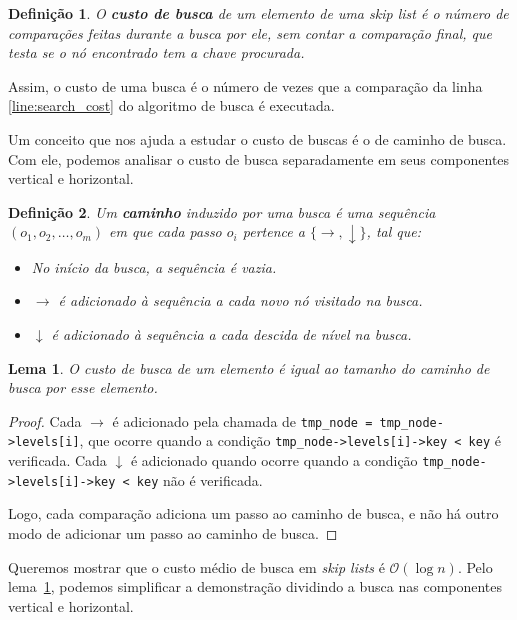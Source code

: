 \documentclass[paper=a4, fontsize=11pt]{scrartcl} %
\newtheorem{definition}{Definição}
\newtheorem{lemma}[theorem]{Lema}
\numberwithin{equation}{section}
\numberwithin{figure}{section}
\numberwithin{table}{section}
\numberwithin{definition}{section}
\numberwithin{theorem}{section}
\numberwithin{property}{section}
\numberwithin{proposition}{section}
\newcommand{\cO}{\ensuremath{\mathcal{O}}}
\newcommand{\sls}{\textit{skip lists}\xspace}
\renewcommand{\sl}{\textit{skip list}\xspace}
\begin{document}
\begin{definition}

O \textbf{custo de busca} de um elemento de uma \sl é o número de comparações feitas durante a busca por ele, sem
contar a comparação final, que testa se o nó encontrado tem a chave procurada.

\end{definition}

Assim, o custo de uma busca é o número de vezes que a comparação da linha \ref{line:search_cost} do algoritmo
de busca é executada.

Um conceito que nos ajuda a estudar o custo de buscas é o de caminho de busca. Com ele, podemos analisar o
custo de busca separadamente em seus componentes vertical e horizontal.

\begin{definition}

Um \textbf{caminho} induzido por uma busca é uma sequência $(o_1, o_2, \ldots, o_m)$ 
em que cada passo $o_i$ pertence a $\{\rightarrow, \downarrow\}$, tal que:

\begin{itemize}[noitemsep]
  \item No início da busca, a sequência é vazia.
  \item $\rightarrow$ é adicionado à sequência a cada novo nó visitado na busca.
  \item $\downarrow$ é adicionado à sequência a cada descida de nível na busca.
\end{itemize}

\end{definition}

\begin{lemma} \label{lemma:custo_busca_caminho}
O custo de busca de um elemento é igual ao tamanho do caminho de busca por esse elemento.
\end{lemma}

\begin{proof}
Cada $\rightarrow$ é adicionado pela chamada de \verb|tmp_node = tmp_node->levels[i]|, que ocorre quando a condição
\verb|tmp_node->levels[i]->key < key| é verificada. 
Cada $\downarrow$ é adicionado quando ocorre quando a condição \verb|tmp_node->levels[i]->key < key| 
não é verificada.

Logo, cada comparação adiciona um passo ao caminho de busca, e não há outro modo de adicionar um passo ao
caminho de busca.
\end{proof}

Queremos mostrar que o custo médio de busca em \sls é $\cO(\log n)$. Pelo lema~\ref{lemma:custo_busca_caminho},
podemos simplificar a demonstração dividindo a busca nas componentes vertical e horizontal.
\end{document}
